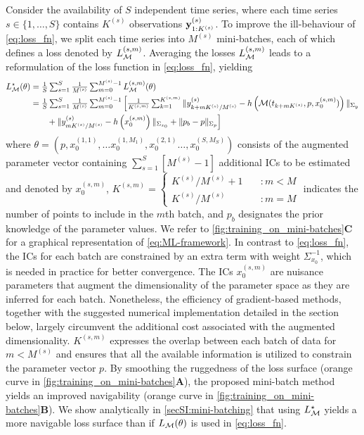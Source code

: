 Consider the availability of $S$ independent time series, where each time series $s \in \{1,\dots,S\}$ contains $K^{(s)}$ observations $\textbf{y}_{1:K^{(s)}}^{(s)}$. To improve the ill-behaviour of \cref{eq:loss_fn}, we split each time series into $M^{(s)}$ mini-batches, each of which defines a loss denoted by $L_{\mathcal{M}}^{(s,m)}$.
%
Averaging the losses $L_{\mathcal{M}}^{(s,m)}$ leads to a reformulation of the loss function in \cref{eq:loss_fn}, yielding
%
\begin{equation}\label{eq:ML-framework}
    \begin{split}
        L_{\mathcal{M}}^\star(\theta) &=  \textstyle \frac{1}{S}\sum_{s=1}^{S} \frac{1}{M^{(s)}} \textstyle \sum_{m=0}^{M^{(s)}-1} L_{\mathcal{M}}^{(s,m)}(\theta)\\
        &= \textstyle \frac{1}{S} \textstyle \sum_{s=1}^{S} \frac{1}{M^{(s)}} \textstyle \sum_{m=0}^{M^{(s)}-1} \Big[ \textstyle \frac{1}{K^{(s,m)}}  \sum_{k=1}^{K^{(s,m)}} \|y_{k + m K^{(s)} / M^{(s)}}^{(s)} - h\left(\mathcal{M}(t_{k + m K^{(s)}}, p, x_{0}^{(s,m)})\right)\|_{\Sigma_y} \\
        & \qquad 
        + \|y_{m K^{(s)} / M^{(s)}}^{(s)} - h\left(x_{0}^{(s,m)}\right)\|_{\Sigma_{x_0}} 
        + \|p_b -  p\|_{\Sigma_p} \Big]
    \end{split}
\end{equation}
%
where 
% 
$\theta = (p, x_{0}^{(1,1)}, \dots  x_0^{(1,M_1)}, x_{0}^{(2,1)} \dots, x_{0}^{(S,M_S)})$ 
%
consists of the augmented parameter vector containing 
%
$\sum_{s=1}^S \left[ M^{(s)} -1 \right]$ 
%
additional ICs to be estimated and denoted by  $x_{0}^{(s,m)}$, 
% 
$K^{(s,m)} = \begin{cases} K^{(s)} / M^{(s)} + 1 &\quad \colon m < M \\ 
                    K^{(s)} / M^{(s)} &\quad \colon m = M
        \end{cases}$ 
% 
% 
indicates the number of points to include in the $m$th batch, and 
% 
$p_b$ 
% 
designates the prior knowledge of the parameter values. 
% 
We refer to \cref{fig:training_on_mini-batches}\textbf{C} for a graphical representation of \cref{eq:ML-framework}.
%
In contrast to \cref{eq:loss_fn}, the ICs for each batch are constrained by an extra term with weight $\Sigma_{x_0}^{-1}$, which is needed in practice for better convergence.
% 
The ICs $x_{0}^{(s,m)}$ are nuisance parameters that augment the dimensionality of the parameter space as they are inferred for each batch. Nonetheless, the efficiency of gradient-based methods, together with the suggested numerical implementation detailed in the section below, largely circumvent the additional cost associated with the augmented dimensionality.
% 
$K^{(s,m)}$ expresses the overlap between each batch of data for $m < M^{(s)}$ and ensures that all the available information is utilized to constrain the parameter vector $p$.
%
By smoothing the ruggedness of the loss surface (orange curve in \cref{fig:training_on_mini-batches}\textbf{A}), the proposed mini-batch method yields an improved navigability (orange curve in \cref{fig:training_on_mini-batches}\textbf{B}). We show analytically in \cref{secSI:mini-batching} that using $L_{\mathcal{M}}^\star$ yields a more navigable loss surface than if $L_{\mathcal{M}}(\theta)$ is used in \cref{eq:loss_fn}.

